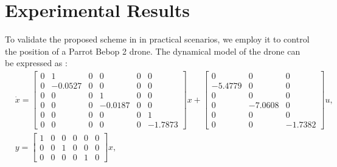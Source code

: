 \documentclass[1p,times]{elsarticle}
\begin{document}
{{\color{blue}}
\section{Experimental Results}
To validate the proposed scheme in in practical scenarios, we employ it to control the position of a Parrot Bebop 2 drone. The dynamical model of the drone can be expressed as \cite{AmiriMECC}:
$$
\begin{aligned}
& \dot{x}=\left[\begin{array}{cccccc}
0 & 1 & 0 & 0 & 0 & 0 \\
0 & -0.0527 & 0 & 0 & 0 & 0 \\
0 & 0 & 0 & 1 & 0 & 0 \\
0 & 0 & 0 & -0.0187 & 0 & 0 \\
0 & 0 & 0 & 0 & 0 & 1 \\
0 & 0 & 0 & 0 & 0 & -1.7873
\end{array}\right] x+\left[\begin{array}{ccc}
0 & 0 & 0 \\
-5.4779 & 0 & 0 \\
0 & 0 & 0 \\
0 & -7.0608 & 0 \\
0 & 0 & 0 \\
0 & 0 & -1.7382
\end{array}\right] u, \\
& y=\left[\begin{array}{llllll}
1 & 0 & 0 & 0 & 0 & 0 \\
0 & 0 & 1 & 0 & 0 & 0 \\
0 & 0 & 0 & 0 & 1 & 0
\end{array}\right] x,
\end{aligned}
$$









}
\end{document}
